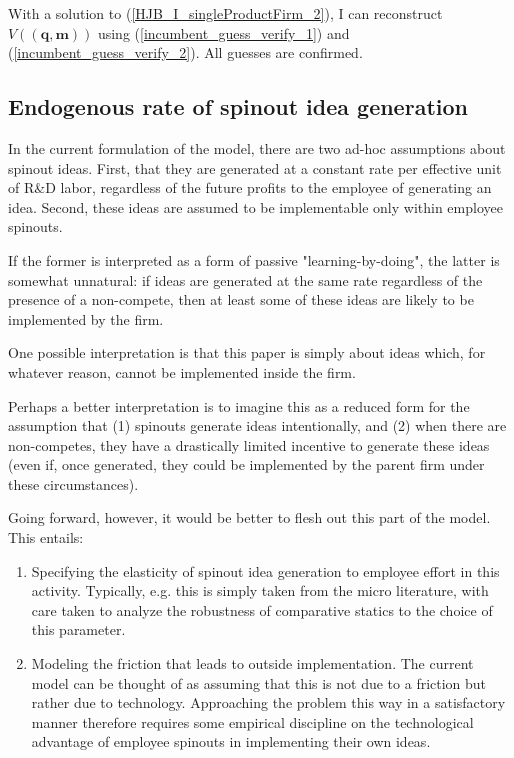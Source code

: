 \documentclass[12pt,english]{article}
\theoremstyle{remark}
\begin{document}
With a solution to (\ref{HJB_I_singleProductFirm_2}), I can reconstruct $V(\mathbf{(q,m)})$ using (\ref{incumbent_guess_verify_1}) and (\ref{incumbent_guess_verify_2}). All guesses are confirmed. 



\subsection{Endogenous rate of spinout idea generation}

In the current formulation of the model, there are two ad-hoc assumptions about spinout ideas. First, that they are generated at a constant rate per effective unit of R\&D labor, regardless of the future profits to the employee of generating an idea. Second, these ideas are assumed to be implementable only within employee spinouts. 

If the former is interpreted as a form of passive "learning-by-doing", the latter is somewhat unnatural: if ideas are generated at the same rate regardless of the presence of a non-compete, then at least some of these ideas are likely to be implemented by the firm.

One possible interpretation is that this paper is simply about ideas which, for whatever reason, cannot be implemented inside the firm. 

Perhaps a better interpretation is to imagine this as a reduced form for the assumption that (1) spinouts generate ideas intentionally, and (2) when there are non-competes, they have a drastically limited incentive to generate these ideas (even if, once generated, they could be implemented by the parent firm under these circumstances).

Going forward, however, it would be better to flesh out this part of the model. This entails: 

\begin{enumerate}
	\item Specifying the elasticity of spinout idea generation to employee effort in this activity. Typically, e.g. \cite{baslandze_spinout_2019} this is simply taken from the micro literature, with care taken to analyze the robustness of comparative statics to the choice of this parameter.
	\item Modeling the friction that leads to outside implementation. The current model can be thought of as assuming that this is not due to a friction but rather due to technology. Approaching the problem this way in a satisfactory manner therefore requires some empirical discipline on the technological advantage of employee spinouts in implementing their own ideas.
\end{enumerate}
\end{document}
